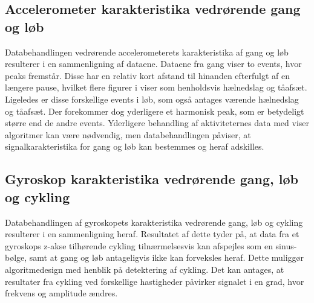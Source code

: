 \subsection{Accelerometer karakteristika vedrørende gang og løb}
Databehandlingen vedrørende accelerometerets karakteristika af gang og løb resulterer i en sammenligning af dataene. Dataene fra gang viser to events, hvor peaks fremstår. Disse har en relativ kort afstand til hinanden efterfulgt af en længere pause, hvilket flere figurer i  viser som henholdsvis hælnedslag og tåafsæt. Ligeledes er disse forskellige events i løb, som også antages værende hælnedslag og tåafsæt. Der forekommer dog yderligere et harmonisk peak, som er betydeligt større end de andre events. Yderligere behandling af aktiviteternes data med viser algoritmer kan være nødvendig, men databehandlingen påviser, at signalkarakteristika for gang og løb kan bestemmes og heraf adskilles.

\subsection{Gyroskop karakteristika vedrørende gang, løb og cykling}
Databehandlingen af gyroskopets karakteristika vedrørende gang, løb og cykling resulterer i en sammenligning heraf. Resultatet af dette tyder på, at data fra et gyroskops z-akse tilhørende cykling tilnærmelsesvis kan afspejles som en sinus-bølge, samt at gang og løb antageligvis ikke kan forveksles heraf. Dette muliggør algoritmedesign med henblik på detektering af cykling. Det kan antages, at resultater fra cykling ved forskellige hastigheder påvirker signalet i en grad, hvor frekvens og amplitude ændres.

